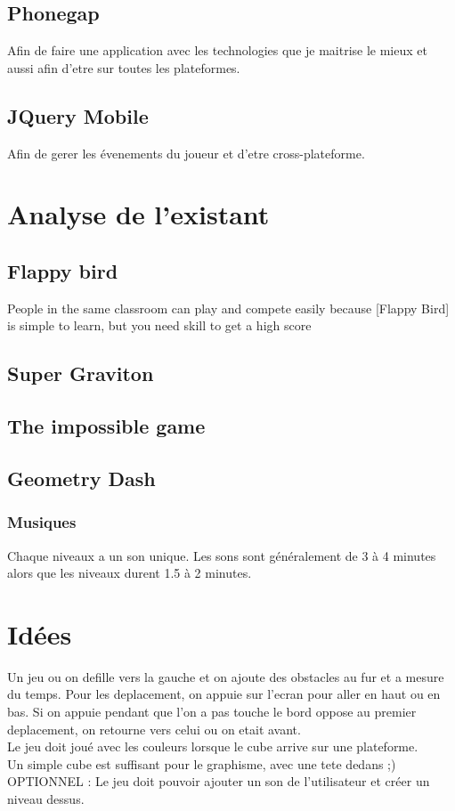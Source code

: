 \documentclass{article}
\begin{document}
\subsection{Phonegap}
Afin de faire une application avec les technologies que je maitrise le mieux et aussi afin d'etre sur toutes les plateformes.
\subsection{JQuery Mobile}
Afin de gerer les évenements du joueur et d'etre cross-plateforme.
\section{Analyse de l'existant}
\subsection{Flappy bird}
People in the same classroom can play and compete easily because [Flappy Bird] is simple to learn, but you need skill to get a high score

\subsection{Super Graviton}
\subsection{The impossible game}
\subsection{Geometry Dash}
\subsubsection{Musiques}
Chaque niveaux a un son unique. Les sons sont généralement de 3 à 4 minutes alors que les niveaux durent 1.5 à 2 minutes.

\section{Idées}
Un jeu ou on defille vers la gauche et on ajoute des obstacles au fur et a mesure du temps. Pour les deplacement, on appuie sur l'ecran pour aller en haut ou en bas. Si on appuie pendant que l'on a pas touche le bord oppose au premier deplacement, on retourne vers celui ou on etait avant.\\


Le jeu doit joué avec les couleurs lorsque le cube arrive sur une plateforme.\\

Un simple cube est suffisant pour le graphisme, avec une tete dedans ;)\\

OPTIONNEL : Le jeu doit pouvoir ajouter un son de l'utilisateur et créer un niveau dessus.\\
\end{document}
